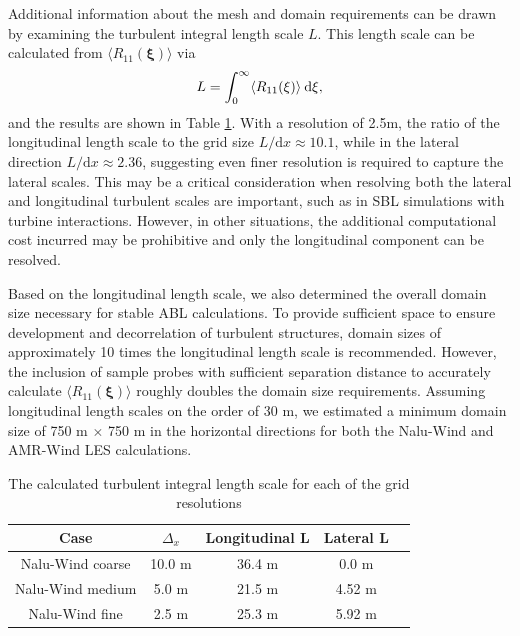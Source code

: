 Additional information about the mesh and domain requirements can be
drawn by examining the turbulent integral length scale $L$.  This
length scale can be calculated from $\langle R_{11}(\boldsymbol{\xi})
\rangle$ via
\begin{equation}
  L = \int_0^\infty \langle R_{11}(\xi) \rangle \: {\textrm d}\xi,
\end{equation}
and the results are shown in Table \ref{tab:GridStudyLscale}.  With a
resolution of 2.5m, the ratio of the longitudinal length scale to the
grid size $L/\textrm{d}x \approx 10.1$, while in the lateral direction
$L/\textrm{d}x \approx 2.36$, suggesting even finer resolution is
required to capture the lateral scales.  This may be a critical
consideration when resolving both the lateral and longitudinal
turbulent scales are important, such as in SBL simulations with
turbine interactions.  However, in other situations, the additional
computational cost incurred may be prohibitive and only the
longitudinal component can be resolved.

Based on the longitudinal length scale, we also determined the
overall domain size necessary for stable ABL calculations.  To provide
sufficient space to ensure development and decorrelation of turbulent
structures, domain sizes of approximately 10 times the longitudinal
length scale is recommended.  However, the inclusion of sample probes
with sufficient separation distance to accurately calculate $\langle
R_{11}(\boldsymbol{\xi}) \rangle$ roughly doubles the domain size
requirements.  Assuming longitudinal length scales on the order of
30 m, we estimated a minimum domain size of 750 m $\times$ 750 m in the
horizontal directions for both the Nalu-Wind and AMR-Wind LES
calculations.

\begin{table} %
\caption{\label{tab:GridStudyLscale} The calculated turbulent integral
  length scale for each of the grid resolutions} \centering
\begin{tabular}{ccccc}
  \hline
  Case              & $\Delta_x$ & Longitudinal L  & Lateral L \\
  \hline
  Nalu-Wind coarse  &  10.0 m  & 36.4 m         & 0.0 m     \\
  Nalu-Wind medium  &   5.0 m & 21.5 m         & 4.52 m    \\
  Nalu-Wind fine    &   2.5 m & 25.3 m         & 5.92 m    \\
\hline
\end{tabular}
\end{table}

